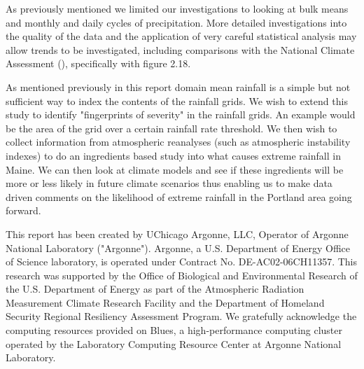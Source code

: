\documentclass[twocol]{ametsoc}
\begin{document}
As previously mentioned we limited our investigations to looking at bulk means and monthly and daily cycles of precipitation. More detailed investigations
 into the quality of the data and the application of very careful statistical analysis may allow trends to be investigated, including comparisons with the 
 National Climate Assessment (\cite{climchange}), specifically with figure 2.18. 
 
As mentioned previously in this report domain mean rainfall is a simple but not sufficient way to index the contents of the rainfall grids. We wish 
to extend this study to identify "fingerprints of severity" in the rainfall grids. An example would be the area of the grid over a certain rainfall rate 
threshold. We then wish to collect information from atmospheric reanalyses (such as atmospheric instability indexes) to do an ingredients based 
study into what causes extreme rainfall in Maine. We can then look at climate models and see if these ingredients will be more or less likely in 
future climate scenarios thus enabling us to make data driven comments on the likelihood of extreme rainfall in the Portland area going forward. 




\acknowledgments{}
This report has been created by UChicago Argonne, LLC, Operator of Argonne National Laboratory ("Argonne"). 
Argonne, a U.S. Department of Energy Office of Science laboratory, is operated under Contract No. DE-AC02-06CH11357. 
This research was supported by the Office of Biological and Environmental Research of the U.S. Department of Energy as
 part of the Atmospheric Radiation Measurement Climate Research Facility and the Department of Homeland Security
 Regional Resiliency Assessment Program. We gratefully acknowledge the computing resources provided on Blues,
 a high-performance computing cluster operated by the Laboratory Computing Resource Center at Argonne National Laboratory.
 
\end{document}

